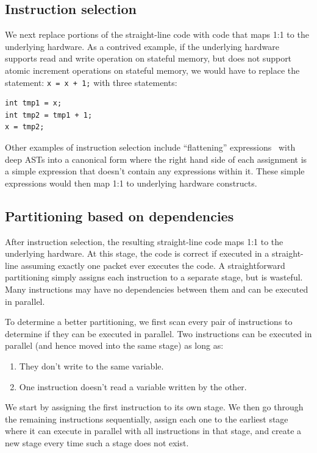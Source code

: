 \subsection{Instruction selection}
We next replace portions of the straight-line code with code that maps 1:1 to
the underlying hardware. As a contrived example, if the underlying hardware
supports read and write operation on stateful memory, but does not support
atomic increment operations on stateful memory, we would have to replace the
statement: \texttt{x = x + 1;} with three statements:
\begin{verbatim}
int tmp1 = x;
int tmp2 = tmp1 + 1;
x = tmp2;
\end{verbatim}

Other examples of instruction selection include ``flattening''
expressions~\cite{expression_flattening} with deep ASTs into a canonical form
where the right hand side of each assignment is a simple expression that
doesn't contain any expressions within it. These simple expressions would then
map 1:1 to underlying hardware constructs.

\subsection{Partitioning based on dependencies}
After instruction selection, the resulting straight-line code maps 1:1 to the
underlying hardware. At this stage, the code is correct if executed in a
straight-line assuming exactly one packet ever executes the code. A
straightforward partitioning simply assigns each instruction to a separate
stage, but is wasteful. Many instructions may have no dependencies between them
and can be executed in parallel.

To determine a better partitioning, we first scan every pair of instructions
to determine if they can be executed in parallel. Two instructions can be
executed in parallel (and hence moved into the same stage) as long as:
\begin{enumerate}
\item They don't write to the same variable.
\item One instruction doesn't read a variable written by the other.
\end{enumerate}
We start by assigning the first instruction to its own stage. We then go
through the remaining instructions sequentially, assign each one to the
earliest stage where it can execute in parallel with all instructions in that
stage, and create a new stage every time such a stage does not exist.

